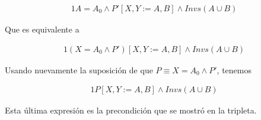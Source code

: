 \begin{alignat}{1}%
A = A_0 \land P'[X,Y := A,B] \land Invs (A \cup B)
\end{alignat}

Que es equivalente a

\begin{alignat}{1}%
(X = A_0 \land P')[X,Y := A,B] \land Invs (A \cup B)
\end{alignat}

\newpage
Usando nuevamente la suposición de que $P \equiv X = A_0 \land P'$, tenemos

\begin{alignat}{1}%
P[X,Y := A,B] \land Invs (A \cup B)
\end{alignat}

Esta última expresión es la precondición que se mostró en la tripleta.
